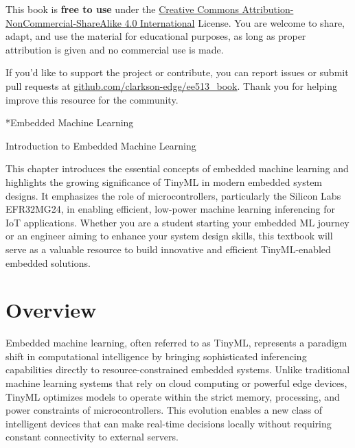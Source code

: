 \documentclass[
  9pt,
  letterpaper,
  abstract,
  titlepage]{scrbook}
\makeatletter
\renewcommand\chapter{\clearpage\global\@topnum\z@
\@afterindentfalse \secdef\@chapter\@schapter}
\renewcommand{\part}[1]{%
    \chapter*{#1} %
    \addcontentsline{toc}{part}{#1} %
}
\newif\if@firstnumbered%
\newif\if@firstunnumbered%
\newcounter{lastRomanPage}
\let\old@chapter\chapter%
\renewcommand{\chapter}{%
  \@ifstar{\unnumbered@chapter}{\numbered@chapter}%
}
\newcommand{\numbered@chapter}[1]{%
  \if@firstnumbered%
    \cleardoublepage%
    \setcounter{lastRomanPage}{\value{page}}%
    \pagenumbering{arabic}%
    \@firstnumberedfalse%
  \else
    \setcounter{page}{\value{page}}%
  \fi
  \old@chapter{#1}%
}
\newcommand{\unnumbered@chapter}[1]{%
  \if@firstunnumbered%
    \clearpage
    \setcounter{lastRomanPage}{\value{page}}%
    \pagenumbering{roman}%
    \@firstunnumberedfalse%
  \fi
  \old@chapter*{#1}%
}
\makeatother
\begin{document}

This book is \textbf{free to use} under the
\href{https://creativecommons.org/licenses/by-nc-sa/4.0/}{Creative
Commons Attribution-NonCommercial-ShareAlike 4.0 International} License.
You are welcome to share, adapt, and use the material for educational
purposes, as long as proper attribution is given and no commercial use
is made.

If you'd like to support the project or contribute, you can report
issues or submit pull requests at
\href{https://github.com/clarkson-edge/ee513_book}{github.com/clarkson-edge/ee513\_book}.
Thank you for helping improve this resource for the community.

\part{Embedded Machine Learning}

\chapter{Introduction to Embedded Machine
Learning}\label{introduction-to-embedded-machine-learning}

This chapter introduces the essential concepts of embedded machine
learning and highlights the growing significance of TinyML in modern
embedded system designs. It emphasizes the role of microcontrollers,
particularly the Silicon Labs EFR32MG24, in enabling efficient,
low-power machine learning inferencing for IoT applications. Whether you
are a student starting your embedded ML journey or an engineer aiming to
enhance your system design skills, this textbook will serve as a
valuable resource to build innovative and efficient TinyML-enabled
embedded solutions.

\section{Overview}\label{overview}

Embedded machine learning, often referred to as TinyML, represents a
paradigm shift in computational intelligence by bringing sophisticated
inferencing capabilities directly to resource-constrained embedded
systems. Unlike traditional machine learning systems that rely on cloud
computing or powerful edge devices, TinyML optimizes models to operate
within the strict memory, processing, and power constraints of
microcontrollers. This evolution enables a new class of intelligent
devices that can make real-time decisions locally without requiring
constant connectivity to external servers.
\end{document}
